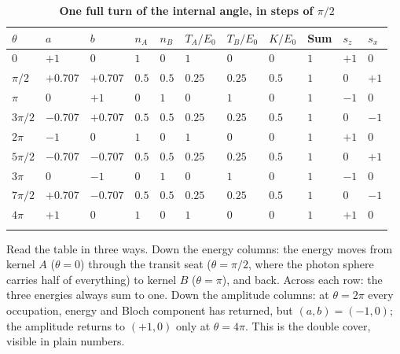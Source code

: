 \documentclass[%
 reprint, amsmath,amssymb, aps, prb, ]{revtex4-2}
\numberwithin{equation}{section}
\begin{document}
\begin{table}[t!]
\centering
\caption{\textbf{One full turn of the internal angle, in steps of $\pi/2$}}
\label{tab:trace}
\renewcommand{\arraystretch}{1.3}
\begin{tabular}{p{1.4cm}p{1.15cm}p{1.15cm}p{1.15cm}p{1.15cm}p{1.15cm}p{1.15cm}p{1.15cm}p{1.15cm}p{1.15cm}p{1.15cm}}
\toprule
$\theta$ & $a$ & $b$ & $n_A$ & $n_B$ & $T_A/E_0$ & $T_B/E_0$ & $K/E_0$ & Sum & $s_z$ & $s_x$ \\
\midrule
$0$ & $+1$ & $0$ & $1$ & $0$ & $1$ & $0$ & $0$ & $1$ & $+1$ & $0$ \\
\addlinespace[0.15cm]
$\pi/2$ & $+0.707$ & $+0.707$ & $0.5$ & $0.5$ & $0.25$ & $0.25$ & $0.5$ & $1$ & $0$ & $+1$ \\
\addlinespace[0.15cm]
$\pi$ & $0$ & $+1$ & $0$ & $1$ & $0$ & $1$ & $0$ & $1$ & $-1$ & $0$ \\
\addlinespace[0.15cm]
$3\pi/2$ & $-0.707$ & $+0.707$ & $0.5$ & $0.5$ & $0.25$ & $0.25$ & $0.5$ & $1$ & $0$ & $-1$ \\
\addlinespace[0.15cm]
$2\pi$ & $-1$ & $0$ & $1$ & $0$ & $1$ & $0$ & $0$ & $1$ & $+1$ & $0$ \\
\addlinespace[0.15cm]
$5\pi/2$ & $-0.707$ & $-0.707$ & $0.5$ & $0.5$ & $0.25$ & $0.25$ & $0.5$ & $1$ & $0$ & $+1$ \\
\addlinespace[0.15cm]
$3\pi$ & $0$ & $-1$ & $0$ & $1$ & $0$ & $1$ & $0$ & $1$ & $-1$ & $0$ \\
\addlinespace[0.15cm]
$7\pi/2$ & $+0.707$ & $-0.707$ & $0.5$ & $0.5$ & $0.25$ & $0.25$ & $0.5$ & $1$ & $0$ & $-1$ \\
\addlinespace[0.15cm]
$4\pi$ & $+1$ & $0$ & $1$ & $0$ & $1$ & $0$ & $0$ & $1$ & $+1$ & $0$ \\
\addlinespace[0.2cm]
\bottomrule
\end{tabular}
\vspace{0.2cm}
\begin{minipage}{0.95\textwidth}
\justifying\footnotesize
Read the table in three ways. Down the energy columns: the energy moves from kernel $A$ ($\theta=0$) through the transit seat ($\theta=\pi/2$, where the photon sphere carries half of everything) to kernel $B$ ($\theta=\pi$), and back. Across each row: the three energies always sum to one. Down the amplitude columns: at $\theta=2\pi$ every occupation, energy and Bloch component has returned, but $(a,b)=(-1,0)$; the amplitude returns to $(+1,0)$ only at $\theta=4\pi$. This is the double cover, visible in plain numbers.
\end{minipage}
\end{table}
\end{document}
